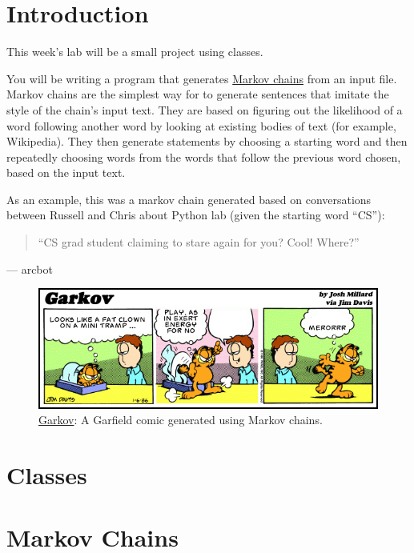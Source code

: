 \documentclass[11pt]{cselabheader}
\begin{document}
\pagebreak
\section{Introduction}

This week's lab will be a small project using classes.

You will be
writing a program that generates
\href{http://en.wikipedia.org/wiki/Markov_chain}{Markov chains} from an input
file. Markov chains are the simplest way for to generate sentences that
imitate the style of the chain's input text.
They are based on figuring out the
likelihood of a word following another word by looking at existing bodies of
text (for example, Wikipedia). They then generate statements by choosing a
starting word and then repeatedly choosing words from the words that follow
the previous word chosen, based on the input text.

As an example, this was a markov chain generated based on conversations between
Russell and Chris about Python lab (given the starting word ``CS''):
\begin{quotation}
``CS grad student claiming to stare again for you? Cool! Where?''
\end{quotation}
\begin{flushright}
--- arcbot
\end{flushright}


\begin{figure}[!ht]
  \centering
  \includegraphics[width=\linewidth]{img/garkov}
  \caption*{\href{http://joshmillard.com/garkov/}{Garkov}:
    A Garfield comic generated using Markov chains.}
  \label{garkov}
\end{figure}

\pagebreak
\section{Classes}
\label{sec:classes}


\pagebreak
\section{Markov Chains}
\label{sec:markov}
\end{document}
